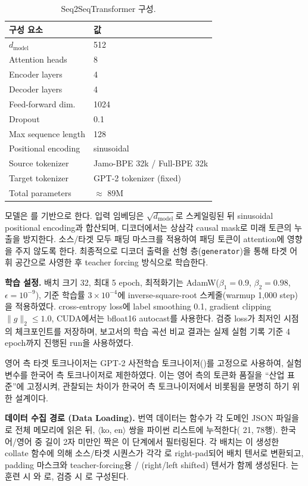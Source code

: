 \documentclass[sigconf,nonacm]{acmart}
\begin{document}
\begin{table}[h]
\caption{Seq2SeqTransformer 구성.}
\label{tab:model}
\small
\begin{tabular}{ll}
\toprule
구성 요소 & 값 \\
\midrule
$d_\text{model}$ & 512 \\
Attention heads & 8 \\
Encoder layers & 4 \\
Decoder layers & 4 \\
Feed-forward dim. & 1024 \\
Dropout & 0.1 \\
Max sequence length & 128 \\
Positional encoding & sinusoidal \\
Source tokenizer & Jamo-BPE 32k / Full-BPE 32k \\
Target tokenizer & GPT-2 tokenizer (fixed) \\
\midrule
Total parameters & $\approx$ 89M \\
\bottomrule
\end{tabular}
\end{table}

모델은 를 기반으로 한다. 입력 임베딩은 $\sqrt{d_\text{model}}$로
스케일링된 뒤 sinusoidal positional encoding과 합산되며, 디코더에서는 상삼각 causal mask로
미래 토큰의 누출을 방지한다. 소스/타겟 모두 패딩 마스크를 적용하여 패딩 토큰이 attention에
영향을 주지 않도록 한다. 최종적으로 디코더 출력을 선형 층(\texttt{generator})을 통해 타겟 어휘 공간으로
사영한 후 teacher forcing 방식으로 학습한다.

\textbf{학습 설정.} 배치 크기 32, 최대 5 epoch, 최적화기는 AdamW($\beta_1{=}0.9$, $\beta_2{=}0.98$,
$\epsilon{=}10^{-9}$), 기준 학습률 $3 \times 10^{-4}$에 inverse-square-root 스케줄(warmup 1,000 step)을
적용하였다. cross-entropy loss에 label smoothing 0.1, gradient clipping $\|g\|_2 \le 1.0$,
CUDA에서는 bfloat16 autocast를 사용한다. 검증 loss가 최저인 시점의 체크포인트를 저장하며,
보고서의 학습 곡선 비교 결과는 실제 실험 기록 기준 4 epoch까지 진행된 run을 사용하였다.

영어 측 타겟 토크나이저는 GPT-2 사전학습 토크나이저()를
고정으로 사용하여, 실험 변수를 한국어 측 토크나이저로 제한하였다. 이는 영어 측의 토큰화 품질을
``산업 표준''에 고정시켜, 관찰되는 차이가 한국어 측 토크나이저에서 비롯됨을 분명히 하기 위한
설계이다.

\textbf{데이터 수집 경로 (Data Loading).} 번역 데이터는  함수가 각 도메인
JSON 파일을 로 전체 메모리에 읽은 뒤, $\langle$ko, en$\rangle$ 쌍을 파이썬
리스트에 누적한다( 21, 78행). 한국어/영어 중 길이 2자 미만인 짝은 이 단계에서
필터링된다. 각 배치는 이 생성한 collate 함수에 의해 소스/타겟 시퀀스가
각각 로 right-pad되어 배치 텐서로 변환되고, padding 마스크와 teacher-forcing용
/ (right/left shifted) 텐서가 함께 생성된다. 는
훈련 시 와 로, 검증 시 로 구성된다.
\end{document}
